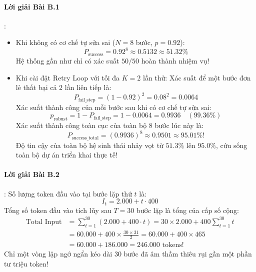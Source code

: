 \paragraph{Lời giải Bài B.1}:
\begin{itemize}
  \item[a)] Khi không có cơ chế tự sửa sai ($N = 8$ bước, $p = 0.92$):
  \begin{equation*}
  P_{\text{success}} = 0.92^8 \approx 0.5132 \approx 51.32\%
  \end{equation*}
  Hệ thống gần như chỉ có xác suất $50/50$ hoàn thành nhiệm vụ!

  \item[b)] Khi cài đặt Retry Loop với tối đa $K = 2$ lần thử:
  Xác suất để một bước đơn lẻ thất bại cả 2 lần liên tiếp là:
  \begin{equation*}
  P_{\text{fail\_step}} = (1 - 0.92)^2 = 0.08^2 = 0.0064
  \end{equation*}
  Xác suất thành công của mỗi bước sau khi có cơ chế tự sửa sai:
  \begin{equation*}
  p_{\text{robust}} = 1 - P_{\text{fail\_step}} = 1 - 0.0064 = 0.9936 \quad (99.36\%)
  \end{equation*}
  Xác suất thành công toàn cục của toàn bộ 8 bước lúc này là:
  \begin{equation*}
  P_{\text{success\_total}} = (0.9936)^8 \approx 0.9501 \approx 95.01\%!
  \end{equation*}
  Độ tin cậy của toàn bộ hệ sinh thái nhảy vọt từ $51.3\%$ lên $95.0\%$, cứu sống toàn bộ dự án triển khai thực tế!
\end{itemize}

\paragraph{Lời giải Bài B.2}:
Số lượng token đầu vào tại bước lặp thứ $t$ là:
\begin{equation*}
I_t = 2.000 + t \cdot 400
\end{equation*}
Tổng số token đầu vào tích lũy sau $T = 30$ bước lặp là tổng của cấp số cộng:
\begin{align*}
\text{Total Input} &= \sum_{t=1}^{30} (2.000 + 400 \cdot t) = 30 \times 2.000 + 400 \sum_{t=1}^{30} t \\
&= 60.000 + 400 \times \frac{30 \times 31}{2} = 60.000 + 400 \times 465 \\
&= 60.000 + 186.000 = 246.000\text{ tokens!}
\end{align*}
Chỉ một vòng lặp ngớ ngẩn kéo dài 30 bước đã âm thầm thiêu rụi gần một phần tư triệu token!

